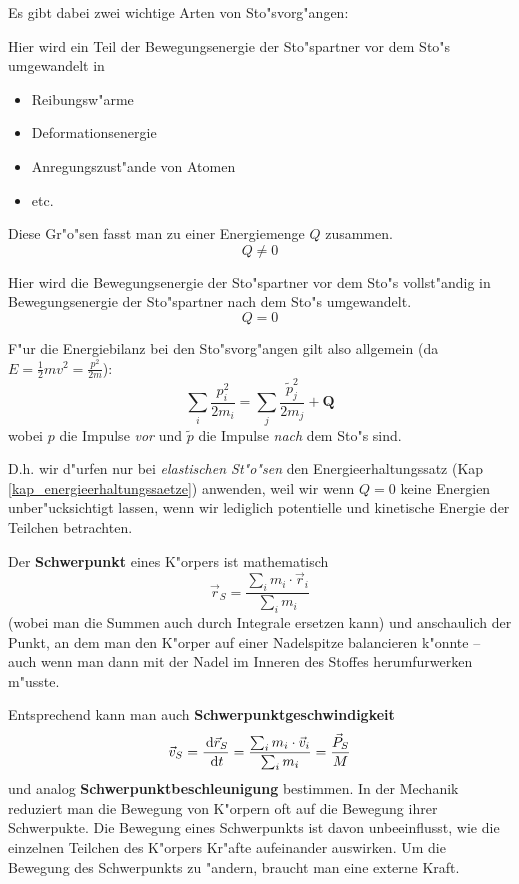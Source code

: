 Es gibt dabei zwei wichtige Arten von Sto"svorg"angen:
\begin{description}[\setlabelstyle{\bfseries\slshape}]
\item[inelastischer Sto"s] Hier wird ein Teil der Bewegungsenergie der
   Sto"spartner vor dem Sto"s umgewandelt in
   \begin{itemize}
   \item Reibungsw"arme
   \item Deformationsenergie
   \item Anregungszust"ande von Atomen
   \item etc.
   \end{itemize}
   Diese Gr"o"sen fasst man zu einer Energiemenge $Q$ zusammen.$$Q \neq
   0$$
\item[elastischer Sto"s] Hier wird die Bewegungsenergie der Sto"spartner
   vor dem Sto"s vollst"andig in Bewegungsenergie der Sto"spartner nach
   dem Sto"s umgewandelt.$$Q = 0$$
\end{description}

\abs
F"ur die Energiebilanz bei den Sto"svorg"angen gilt also allgemein (da $E
= \frac{1}{2} mv^2 = \frac{p^2}{2m}$):
$$
  \sum_i \frac{p_i^2}{2m_i} =   \sum_j \frac{\tilde p_j^2}{2m_j} + \mathbf Q
$$
wobei $p$ die Impulse \emph{vor} und $\tilde p$ die Impulse
\emph{nach} dem Sto"s sind.

D.h. wir d"urfen nur bei \emph{elastischen St"o"sen} den
Energieerhaltungssatz (Kap \ref{kap_energieerhaltungssaetze})
anwenden, weil wir wenn $Q = 0$ keine Energien unber"ucksichtigt
lassen, wenn wir lediglich potentielle und kinetische Energie der
Teilchen betrachten.












\begin{Wichtig}[Schwerpunkt]
\label{def_schwerpunkt}
   Der \textbf{Schwerpunkt} eines K"orpers ist mathematisch
   \begin{equation}
      \label{eqn_schwerpunkt}
      \Vec r_S = \frac{\sum_i m_i \cdot \Vec r_i}{\sum_i m_i}
   \end{equation}
(wobei man die Summen auch durch Integrale ersetzen kann)
   und anschaulich der Punkt, an dem man den K"orper auf einer
   Nadelspitze balancieren k"onnte -- auch wenn man dann mit der Nadel
   im Inneren des Stoffes herumfurwerken m"usste.
\end{Wichtig}
Entsprechend kann man auch \textbf{Schwerpunktgeschwindigkeit}
$$
  \Vec v_S = \frac{\, \mathrm{d} \Vec r_S}{\, \mathrm{d} t} = 
 \frac{\sum_i m_i \cdot \Vec v_i}{\sum_i m_i} =
\frac{\Vec P_S}{M}
$$
und analog \textbf{Schwerpunktbeschleunigung} bestimmen. In der
Mechanik reduziert man die Bewegung von K"orpern oft auf die Bewegung
ihrer Schwerpukte. Die Bewegung eines Schwerpunkts ist davon
unbeeinflusst, wie die einzelnen Teilchen des K"orpers Kr"afte
aufeinander auswirken. Um die Bewegung des Schwerpunkts zu "andern,
braucht man eine externe Kraft.

